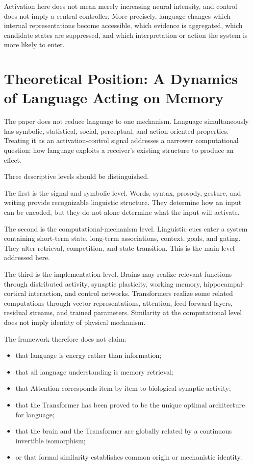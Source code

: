 \documentclass[11pt, a4paper]{article}
\begin{document}
Activation here does not mean merely increasing neural intensity, and control does not imply a central controller. More precisely, language changes which internal representations become accessible, which evidence is aggregated, which candidate states are suppressed, and which interpretation or action the system is more likely to enter.



\section{Theoretical Position: A Dynamics of Language Acting on Memory}


The paper does not reduce language to one mechanism. Language simultaneously has symbolic, statistical, social, perceptual, and action-oriented properties. Treating it as an activation-control signal addresses a narrower computational question: how language exploits a receiver's existing structure to produce an effect.


Three descriptive levels should be distinguished.


The first is the signal and symbolic level. Words, syntax, prosody, gesture, and writing provide recognizable linguistic structure. They determine how an input can be encoded, but they do not alone determine what the input will activate.


The second is the computational-mechanism level. Linguistic cues enter a system containing short-term state, long-term associations, context, goals, and gating. They alter retrieval, competition, and state transition. This is the main level addressed here.


The third is the implementation level. Brains may realize relevant functions through distributed activity, synaptic plasticity, working memory, hippocampal-cortical interaction, and control networks. Transformers realize some related computations through vector representations, attention, feed-forward layers, residual streams, and trained parameters. Similarity at the computational level does not imply identity of physical mechanism.


The framework therefore does not claim:


\begin{itemize}
\item that language is energy rather than information;
\item that all language understanding is memory retrieval;
\item that Attention corresponds item by item to biological synaptic activity;
\item that the Transformer has been proved to be the unique optimal architecture for language;
\item that the brain and the Transformer are globally related by a continuous invertible isomorphism;
\item or that formal similarity establishes common origin or mechanistic identity.
\end{itemize}
\end{document}
